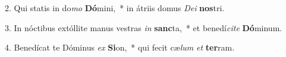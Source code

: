2. Qui statis in do\textit{mo} \textbf{Dó}mini,~*  in átriis domus \textit{De}\textit{i} \textbf{nos}tri.\

3. In nóctibus extóllite manus vestras \textit{in} \textbf{sanc}ta,~*  et benedí\textit{ci}\textit{te} \textbf{Dó}minum.\

4. Benedícat te Dóminus \textit{ex} \textbf{Si}on,~*  qui fecit cæ\textit{lum} \textit{et} \textbf{ter}ram.\

